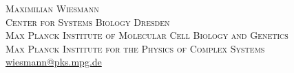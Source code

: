 \documentclass[11pt, a4paper]{article}
\numberwithin{theorem}{section}
\theoremstyle{remark}
\DeclareMathOperator{\Aut}{Aut}
\newcommand{\bb}[1]{\boldsymbol{#1}}
\renewcommand{\i}{\mathrm{i}}
\theoremstyle{theorem}
\begin{document}


\printbibliography


\noindent \textsc{Maximilian Wiesmann}\\
\textsc{Center for Systems Biology Dresden}\\
\textsc{Max Planck Institute of Molecular Cell Biology and Genetics}\\
\textsc{Max Planck Institute for the Physics of Complex Systems}\\
\url{wiesmann@pks.mpg.de}
\end{document}
